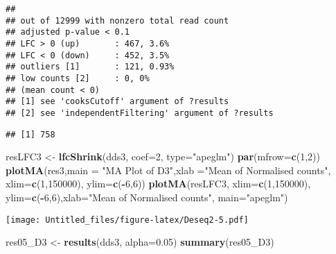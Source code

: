 \documentclass[]{article}
\newenvironment{Shaded}{\begin{snugshade}}{\end{snugshade}}
\newcommand{\DataTypeTok}[1]{\textcolor[rgb]{0.13,0.29,0.53}{#1}}
\newcommand{\DecValTok}[1]{\textcolor[rgb]{0.00,0.00,0.81}{#1}}
\newcommand{\FloatTok}[1]{\textcolor[rgb]{0.00,0.00,0.81}{#1}}
\newcommand{\KeywordTok}[1]{\textcolor[rgb]{0.13,0.29,0.53}{\textbf{#1}}}
\newcommand{\NormalTok}[1]{#1}
\newcommand{\OperatorTok}[1]{\textcolor[rgb]{0.81,0.36,0.00}{\textbf{#1}}}
\newcommand{\OtherTok}[1]{\textcolor[rgb]{0.56,0.35,0.01}{#1}}
\newcommand{\StringTok}[1]{\textcolor[rgb]{0.31,0.60,0.02}{#1}}
\begin{document}
\begin{verbatim}
## 
## out of 12999 with nonzero total read count
## adjusted p-value < 0.1
## LFC > 0 (up)       : 467, 3.6%
## LFC < 0 (down)     : 452, 3.5%
## outliers [1]       : 121, 0.93%
## low counts [2]     : 0, 0%
## (mean count < 0)
## [1] see 'cooksCutoff' argument of ?results
## [2] see 'independentFiltering' argument of ?results
\end{verbatim}

\begin{Shaded}
\end{Shaded}

\begin{verbatim}
## [1] 758
\end{verbatim}

\begin{Shaded}
\begin{Highlighting}[]
\NormalTok{resLFC3 <-}\StringTok{ }\KeywordTok{lfcShrink}\NormalTok{(dds3, }\DataTypeTok{coef=}\DecValTok{2}\NormalTok{, }\DataTypeTok{type=}\StringTok{"apeglm"}\NormalTok{)}
\KeywordTok{par}\NormalTok{(}\DataTypeTok{mfrow=}\KeywordTok{c}\NormalTok{(}\DecValTok{1}\NormalTok{,}\DecValTok{2}\NormalTok{))}
\KeywordTok{plotMA}\NormalTok{(res3,}\DataTypeTok{main =} \StringTok{"MA Plot of D3"}\NormalTok{,}\DataTypeTok{xlab =}\StringTok{"Mean of Normalised counts"}\NormalTok{,}
       \DataTypeTok{xlim=}\KeywordTok{c}\NormalTok{(}\DecValTok{1}\NormalTok{,}\DecValTok{150000}\NormalTok{), }\DataTypeTok{ylim=}\KeywordTok{c}\NormalTok{(}\OperatorTok{-}\DecValTok{6}\NormalTok{,}\DecValTok{6}\NormalTok{))}
\KeywordTok{plotMA}\NormalTok{(resLFC3, }\DataTypeTok{xlim=}\KeywordTok{c}\NormalTok{(}\DecValTok{1}\NormalTok{,}\DecValTok{150000}\NormalTok{), }\DataTypeTok{ylim=}\KeywordTok{c}\NormalTok{(}\OperatorTok{-}\DecValTok{6}\NormalTok{,}\DecValTok{6}\NormalTok{),}\DataTypeTok{xlab=}\StringTok{"Mean of Normalised counts"}\NormalTok{, }\DataTypeTok{main=}\StringTok{"apeglm"}\NormalTok{)}
\end{Highlighting}
\end{Shaded}

\texttt{[image: Untitled\_files/figure-latex/Deseq2-5.pdf]}

\begin{Shaded}
\begin{Highlighting}[]
\NormalTok{res05_D3 <-}\StringTok{ }\KeywordTok{results}\NormalTok{(dds3, }\DataTypeTok{alpha=}\FloatTok{0.05}\NormalTok{)}
\KeywordTok{summary}\NormalTok{(res05_D3)}
\end{Highlighting}
\end{Shaded}
\end{document}
